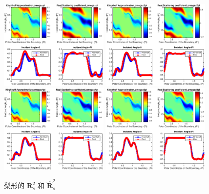 {\begin{figure}[htbp]
	\centering
	\includegraphics[width=0.48\textwidth]{./Img/figure_sc_elastic/sc_s2_pear_1.eps}
	\includegraphics[width=0.48\textwidth]{./Img/figure_sc_elastic/sc_s2_pear_2.eps}
	\includegraphics[width=0.48\textwidth]{./Img/figure_sc_elastic/sc_s2_pear_4.eps}
	\includegraphics[width=0.48\textwidth]{./Img/figure_sc_elastic/sc_s2_pear_8.eps}		
	\caption{梨形的 $\mathbf{R}_s^2$ 和 $\hat {\mathbf{R}}_s^2$ }\label{figure_9}
\end{figure}



}
